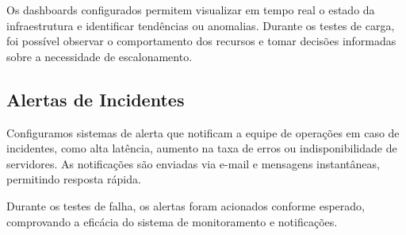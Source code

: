 Os dashboards configurados permitem visualizar em tempo real o estado da infraestrutura e identificar tendências ou anomalias. Durante os testes de carga, foi possível observar o comportamento dos recursos e tomar decisões informadas sobre a necessidade de escalonamento.

\subsection{Alertas de Incidentes}

Configuramos sistemas de alerta que notificam a equipe de operações em caso de incidentes, como alta latência, aumento na taxa de erros ou indisponibilidade de servidores. As notificações são enviadas via e-mail e mensagens instantâneas, permitindo resposta rápida.

Durante os testes de falha, os alertas foram acionados conforme esperado, comprovando a eficácia do sistema de monitoramento e notificações.

